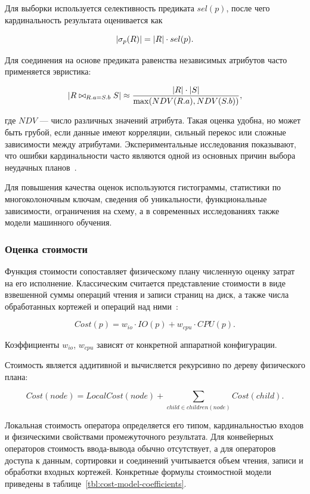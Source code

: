 \documentclass[14pt, russian]{scrartcl}
\begin{document}
Для выборки используется селективность предиката \(sel(p)\), после чего
кардинальность результата оценивается как

\[
    |\sigma_{p}(R)| = |R| \cdot sel(p).
\]

Для соединения на основе предиката равенства независимых атрибутов часто
применяется эвристика:

\[
    |R \bowtie_{R.a = S.b} S| \approx
    \frac{|R| \cdot |S|}{\max(NDV(R.a), NDV(S.b))},
\]

\noindent{}где \(NDV\) --- число различных значений атрибута. Такая оценка удобна, но может
быть грубой, если данные имеют корреляции, сильный перекос или сложные
зависимости между атрибутами. Экспериментальные исследования показывают, что
ошибки кардинальности часто являются одной из основных причин выбора неудачных
планов~\cite{leis2015good}.

Для повышения качества оценок используются гистограммы, статистики по
многоколоночным ключам, сведения об уникальности, функциональные зависимости,
ограничения на схему, а в современных исследованиях также модели машинного
обучения.

\subsubsection{Оценка стоимости}

Функция стоимости сопоставляет физическому плану численную оценку затрат на его
исполнение. Классическим считается представление стоимости в виде взвешенной
суммы операций чтения и записи страниц на диск, а также числа обработанных
кортежей и операций над ними~\cite{GraefeMcKenna1993,Graefe1995}:

\[
    Cost(p) = w_{io} \cdot IO(p) + w_{cpu} \cdot CPU(p).
\]

\noindent{}Коэффициенты \(w_{io}\), \(w_{cpu}\) зависят от конкретной аппаратной
конфигурации.

Стоимость является аддитивной и вычисляется рекурсивно по дереву физического
плана:

\[
    Cost(node) = LocalCost(node) + \sum_{child \in children(node)} Cost(child).
\]

Локальная стоимость оператора определяется его типом, кардинальностью входов и
физическими свойствами промежуточного результата. Для конвейерных операторов
стоимость ввода-вывода обычно отсутствует, а для операторов доступа к данным,
сортировки и соединений учитывается объем чтения, записи и обработки входных
кортежей. Конкретные формулы стоимостной модели приведены в
таблице~\ref{tbl:cost-model-coefficients}.
\end{document}
